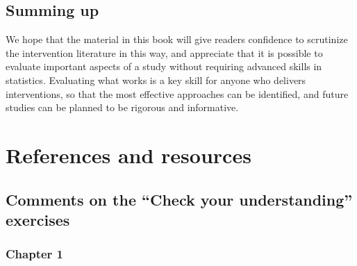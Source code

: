 \documentclass{krantz}
\begin{document}
\hypertarget{summing-up}{%
\section{Summing up}\label{summing-up}}

We hope that the material in this book will give readers confidence to scrutinize the intervention literature in this way, and appreciate that it is possible to evaluate important aspects of a study without requiring advanced skills in statistics. Evaluating what works is a key skill for anyone who delivers interventions, so that the most effective approaches can be identified, and future studies can be planned to be rigorous and informative.

\hypertarget{endmatter}{%
\chapter{References and resources}\label{endmatter}}

\hypertarget{comments-on-the-check-your-understanding-exercises}{%
\section{Comments on the ``Check your understanding'' exercises}\label{comments-on-the-check-your-understanding-exercises}}

\hypertarget{chapter-1}{%
\subsection{Chapter 1}\label{chapter-1}}
\end{document}
